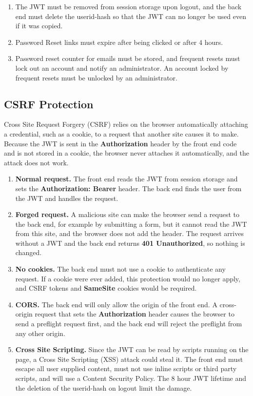 \begin{enumerate}[leftmargin=3\parindent]
            \item The JWT must be removed from session storage upon logout, and the back end must delete the userid-hash so that the JWT can no longer be used even if it was copied.
            \item Password Reset links must expire after being clicked or after 4 hours.
            \item Password reset counter for emails must be stored, and frequent resets must lock out an account and notify an administrator. An account locked by frequent resets must be unlocked by an administrator.
        \end{enumerate}

    \subsection{CSRF Protection}
        Cross Site Request Forgery (CSRF) relies on the browser automatically attaching a credential, such as a cookie, to a request that another site causes it to make.
        Because the JWT is sent in the \textbf{Authorization} header by the front end code and is not stored in a cookie, the browser never attaches it automatically, and the attack does not work.
        \begin{enumerate}[leftmargin=3\parindent]
            \item \textbf{Normal request.} The front end reads the JWT from session storage and sets the \textbf{Authorization: Bearer} header. The back end finds the user from the JWT and handles the request.
            \item \textbf{Forged request.} A malicious site can make the browser send a request to the back end, for example by submitting a form, but it cannot read the JWT from this site, and the browser does not add the header. The request arrives without a JWT and the back end returns \textbf{401 Unauthorized}, so nothing is changed.
            \item \textbf{No cookies.} The back end must not use a cookie to authenticate any request. If a cookie were ever added, this protection would no longer apply, and CSRF tokens and \textbf{SameSite} cookies would be required.
            \item \textbf{CORS.} The back end will only allow the origin of the front end. A cross-origin request that sets the \textbf{Authorization} header causes the browser to send a preflight request first, and the back end will reject the preflight from any other origin.
            \item \textbf{Cross Site Scripting.} Since the JWT can be read by scripts running on the page, a Cross Site Scripting (XSS) attack could steal it. The front end must escape all user supplied content, must not use inline scripts or third party scripts, and will use a Content Security Policy. The 8 hour JWT lifetime and the deletion of the userid-hash on logout limit the damage.
        \end{enumerate}

